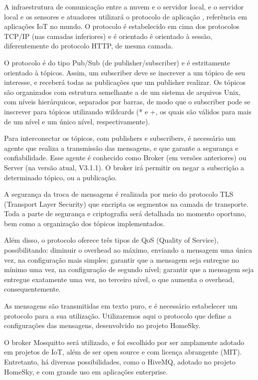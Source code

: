 A infraestrutura de comunicação entre a nuvem e o servidor local, e o servidor local e os sensores e atuadores utilizará o protocolo de aplicação \wmqtt, referência em aplicações IoT no mundo. O protocolo \wmqtt é estabelecido em cima dos protocolos TCP/IP (nas camadas inferiores) e é orientado é orientado à sessão, diferentemente do protocolo HTTP, de mesma camada.

O protocolo \wmqtt é do tipo Pub/Sub (de publisher/subscriber) e é estritamente orientado à tópicos. Assim, um subscriber deve se inscrever a um tópico de seu interesse, e receberá todas as publicações que um publisher realizar. Os tópicos são organizados com estrutura semelhante a de um sistema de arquivos Unix, com níveis hierárquicos, separados por barras, de modo que o subscriber pode se inscrever para tópicos utilizando wildcards (* e +, os quais são válidos para mais de um nível e um único nível, respectivamente).

Para interconectar os tópicos, com publishers e subscribers, é necessário um agente que realiza a transmissão das mensagens, e que garante a segurança e confiabilidade. Esse agente é conhecido como Broker (em versões anteriores) ou Server (na versão atual, V3.1.1). O broker irá permitir ou negar a subscrição a determinado tópico, ou a publicação.

A segurança da troca de mensagens é realizada por meio do protocolo TLS (Transport Layer Security) que encripta os segmentos na camada de transporte. Toda a parte de segurança e criptografia será detalhada no momento oportuno, bem como a organização dos tópicos implementados.

Além disso, o protocolo \wmqtt oferece três tipos de QoS (Quality of Service), possibilitando: diminuir o overhead ao máximo, enviando a mensagem uma única vez, na configuração mais simples; garantir que a mensagem seja entregue no mínimo uma vez, na configuração de segundo nível; garantir que a mensagem seja entregue exatamente uma vez, no terceiro nível, o que aumenta o overhead, consequentemente.

As mensagens são transmitidas em texto puro, e é necessário estabelecer um protocolo para a sua utilização. Utilizaremos aqui o protocolo que define a configurações das mensagens, desenvolvido no projeto HomeSky.

O broker Mosquitto será utilizado, e foi escolhido por ser amplamente adotado em projetos de IoT, além de ser open source e com licença abrangente (MIT). Entretanto, há diversas possibilidades, como o HiveMQ, adotado no projeto HomeSky, e com grande uso em aplicações enterprise.

